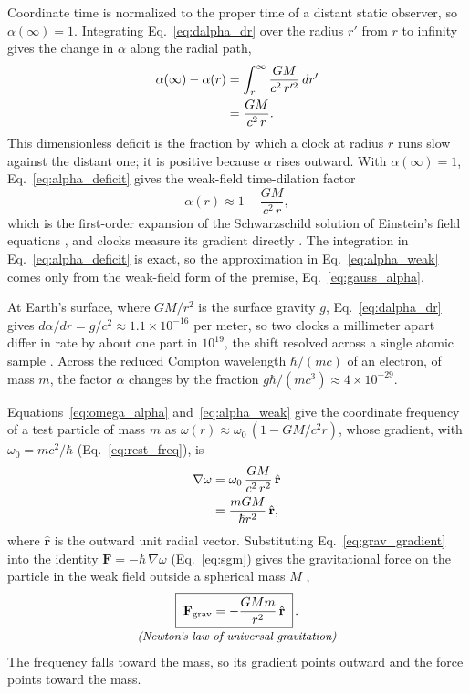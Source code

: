 \documentclass[aps,prd,onecolumn,tightenlines,nofootinbib,notitlepage,11pt,floatfix]{revtex4-2}
\theoremstyle{indentedtheorem}
\begin{document}
Coordinate time is normalized to the proper time of a distant static observer, so $\alpha(\infty)=1$. Integrating Eq.~\eqref{eq:dalpha_dr} over the radius $r'$ from $r$ to infinity gives the change in $\alpha$ along the radial path,
\begin{align}
    \alpha(\infty) - \alpha(r) &= \int_r^\infty \frac{GM}{c^2 \, r'^2} \, dr' \notag\\
    &= \frac{GM}{c^2 \, r} .
    \label{eq:alpha_deficit}
\end{align}
This dimensionless deficit is the fraction by which a clock at radius $r$ runs slow against the distant one; it is positive because $\alpha$ rises outward. With $\alpha(\infty)=1$, Eq.~\eqref{eq:alpha_deficit} gives the weak-field time-dilation factor
\begin{equation}
    \alpha(r) \approx 1 - \frac{GM}{c^2 \, r} ,
    \label{eq:alpha_weak}
\end{equation}
which is the first-order expansion of the Schwarzschild solution of Einstein's field equations \citep{Einstein1915GR,Schwarzschild1916Metric,MTW1973Gravitation}, and clocks measure its gradient directly \citep{Pound1960Apparent,Bothwell2022Resolving}. The integration in Eq.~\eqref{eq:alpha_deficit} is exact, so the approximation in Eq.~\eqref{eq:alpha_weak} comes only from the weak-field form of the premise, Eq.~\eqref{eq:gauss_alpha}.

At Earth's surface, where $GM/r^2$ is the surface gravity $g$, Eq.~\eqref{eq:dalpha_dr} gives $d\alpha/dr=g/c^2\approx1.1\times10^{-16}$ per meter, so two clocks a millimeter apart differ in rate by about one part in $10^{19}$, the shift resolved across a single atomic sample \citep{Bothwell2022Resolving}. Across the reduced Compton wavelength $\hbar/(mc)$ of an electron, of mass $m$, the factor $\alpha$ changes by the fraction $g\hbar/(mc^3)\approx4\times10^{-29}$.

Equations~\eqref{eq:omega_alpha} and~\eqref{eq:alpha_weak} give the coordinate frequency of a test particle of mass $m$ as $\omega(r)\approx\omega_0\,(1-GM/c^2r)$, whose gradient, with $\omega_0=mc^2/\hbar$ (Eq.~\eqref{eq:rest_freq}), is
\begin{align}
    \nabla\omega &= \omega_0\,\frac{GM}{c^2 \, r^2}\,\hat{\mathbf{r}} \notag\\
    &= \frac{mGM}{\hbar r^2}\,\hat{\mathbf{r}} ,
    \label{eq:grav_gradient}
\end{align}
where $\hat{\mathbf{r}}$ is the outward unit radial vector. Substituting Eq.~\eqref{eq:grav_gradient} into the identity $\mathbf{F}=-\hbar\,\nabla\omega$ (Eq.~\eqref{eq:sgm}) gives the gravitational force on the particle in the weak field outside a spherical mass $M$ \citep{Newton1687Philosophiae},
\begin{equation}
    \begin{gathered}
    \boxed{\;\mathbf{F}_\text{grav} = -\frac{GMm}{r^2}\,\hat{\mathbf{r}}\;} \, . \\[-3pt]
    \text{\small\itshape (Newton's law of universal gravitation)}
    \end{gathered}
    \label{eq:newton}
\end{equation}
The frequency falls toward the mass, so its gradient points outward and the force points toward the mass.
\end{document}
